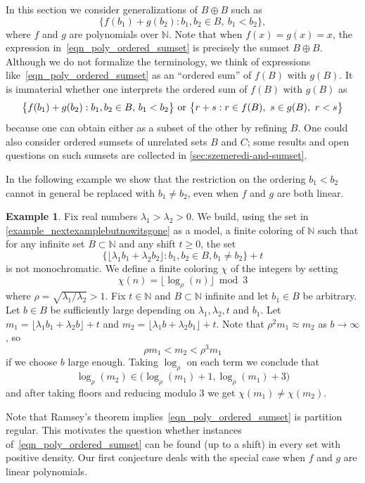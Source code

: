 \documentclass[10pt,dvipsnames]{article}
\theoremstyle{definition}
\newtheorem{example}[theorem]{Example}
\theoremstyle{plain}
\newcommand{\N}{\mathbb{N}}
\begin{document}
In this section we consider generalizations of $B \oplus B$ such as
\begin{equation}
\label{eqn_poly_ordered_sumset}
\big\{f(b_1)+g(b_2): b_1,b_2\in B,~b_1<b_2\big\},
\end{equation}
where $f$ and $g$ are polynomials over $\N$.
Note that when $f(x)=g(x)=x$, the expression in~\eqref{eqn_poly_ordered_sumset} is precisely the sumset $B\oplus B$.
Although we do not formalize the terminology, we think of expressions like~\eqref{eqn_poly_ordered_sumset} as an ``ordered sum'' of $f(B)$ with $g(B)$.
It is immaterial whether one interprets the ordered sum of $f(B)$ with $g(B)$ as
\[
\big\{ f(b_1) + g(b_2) :b_1,b_2\in B,\, b_1 < b_2 \big\} \textup{ or }
\big\{ r + s : r\in f(B),~s\in g(B),~ r < s \big\}
\]
because one can obtain either as a subset of the other by refining $B$.
One could also consider ordered sumsets of unrelated sets $B$ and $C$; some results and open questions on such sumsets are collected in \cref{sec:szemeredi-and-sumset}.

In the following example we show that the restriction on the ordering $b_1< b_2$ cannot in general be replaced with $b_1\neq b_2$, even when $f$ and $g$ are both linear.

\begin{example}\label{proposition_thesameexampleagain}
Fix real numbers $\lambda_1 > \lambda_2 > 0$.
We build, using the set in \cref{example_nextexamplebutnowitsgone} as a model, a finite coloring of $\N$ such that for any infinite set $B\subset\N$ and any shift $t\geq 0$, the set
    $$\big\{\lfloor\lambda_1b_1+\lambda_2b_2\rfloor:b_1,b_2\in B,b_1\neq b_2\big\}+t$$
    is not monochromatic.
We define a finite coloring $\chi$ of the integers by setting
\[
\chi(n)=\lfloor\log_{\rho}(n)\rfloor\bmod 3
\]
where $\rho=\sqrt{\lambda_1/\lambda_2}>1$.
Fix $t\in\N$ and $B\subset\N$ infinite and let $b_1\in B$ be arbitrary.
Let $b\in B$ be sufficiently large depending on $\lambda_1,\lambda_2,t$ and $b_1$.
Let $m_1=\lfloor\lambda_1b_1+\lambda_2b\rfloor+t$ and $m_2=\lfloor\lambda_1b+\lambda_2b_1\rfloor+t$.
Note that $\rho^2m_1\approx m_2$ as $b\to\infty$, so
\[
\rho m_1<m_2 <\rho^3m_1
\]
if we choose $b$ large enough.
Taking $\log_{\rho}$ on each term we conclude that
\[
\log_{\rho}(m_2)\in\Big(\log_{\rho}(m_1)+1,\log_{\rho}(m_1)+3\Big)
\]
and after taking floors and reducing modulo  3 we get $\chi(m_1)\neq\chi(m_2)$.
\end{example}


Note that Ramsey's theorem implies~\eqref{eqn_poly_ordered_sumset} is partition regular.
This motivates the question whether instances of~\eqref{eqn_poly_ordered_sumset} can be found (up to a shift) in every set with positive density. 
Our first conjecture deals with the special case when $f$ and $g$ are linear polynomials.
\end{document}
